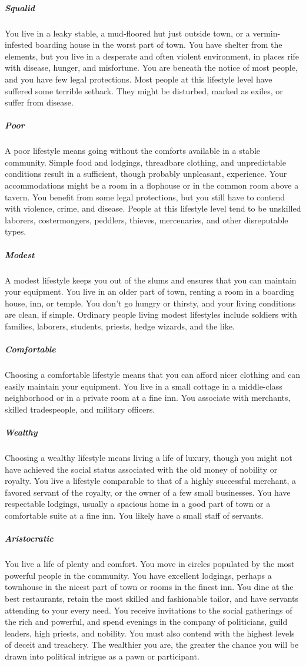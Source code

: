 \subparagraph*{Squalid} You live in a leaky stable, a mud-floored hut just outside town, or a vermin-infested boarding house in the worst part of town. You have shelter from the elements, but you live in a desperate and often violent environment, in places rife with disease, hunger, and misfortune. You are beneath the notice of most people, and you have few legal protections. Most people at this lifestyle level have suffered some terrible setback. They might be disturbed, marked as exiles, or suffer from disease.

\subparagraph*{Poor} A poor lifestyle means going without the comforts available in a stable community. Simple food and lodgings, threadbare clothing, and unpredictable conditions result in a sufficient, though probably unpleasant, experience. Your accommodations might be a room in a flophouse or in the common room above a tavern. You benefit from some legal protections, but you still have to contend with violence, crime, and disease. People at this lifestyle level tend to be unskilled laborers, costermongers, peddlers, thieves, mercenaries, and other disreputable types.

\subparagraph*{Modest} A modest lifestyle keeps you out of the slums and ensures that you can maintain your equipment. You live in an older part of town, renting a room in a boarding house, inn, or temple. You don't go hungry or thirsty, and your living conditions are clean, if simple. Ordinary people living modest lifestyles include soldiers with families, laborers, students, priests, hedge wizards, and the like.

\subparagraph*{Comfortable} Choosing a comfortable lifestyle means that you can afford nicer clothing and can easily maintain your equipment. You live in a small cottage in a middle-class neighborhood or in a private room at a fine inn. You associate with merchants, skilled tradespeople, and military officers.

\subparagraph*{Wealthy} Choosing a wealthy lifestyle means living a life of luxury, though you might not have achieved the social status associated with the old money of nobility or royalty. You live a lifestyle comparable to that of a highly successful merchant, a favored servant of the royalty, or the owner of a few small businesses. You have respectable lodgings, usually a spacious home in a good part of town or a comfortable suite at a fine inn. You likely have a small staff of servants.

\subparagraph*{Aristocratic} You live a life of plenty and comfort. You move in circles populated by the most powerful people in the community. You have excellent lodgings, perhaps a townhouse in the nicest part of town or rooms in the finest inn. You dine at the best restaurants, retain the most skilled and fashionable tailor, and have servants attending to your every need. You receive invitations to the social gatherings of the rich and powerful, and spend evenings in the company of politicians, guild leaders, high priests, and nobility. You must also contend with the highest levels of deceit and treachery. The wealthier you are, the greater the chance you will be drawn into political intrigue as a pawn or participant.

